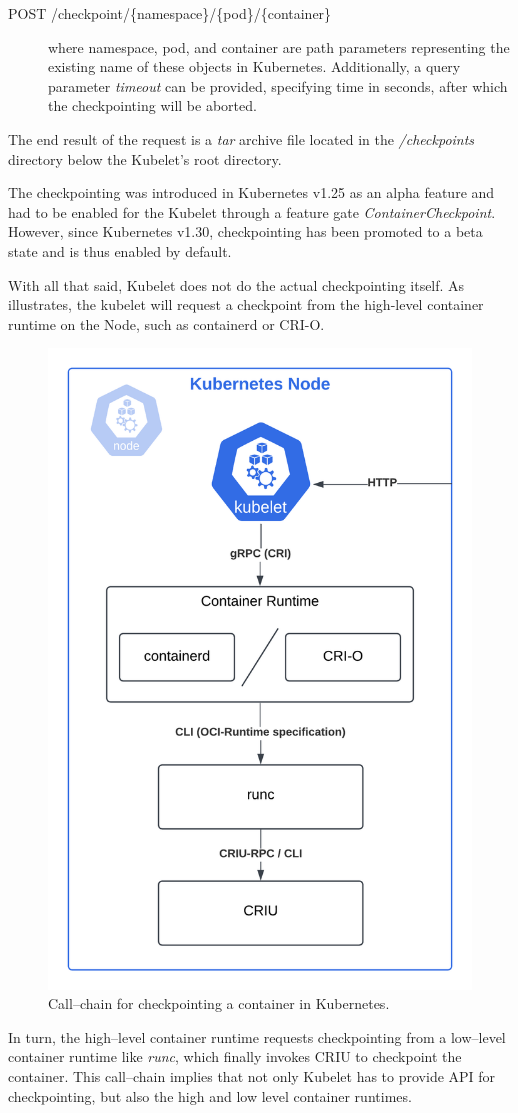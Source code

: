 \documentclass[
  digital,     %
  oneside,     %
  nosansbold,  %
  nocolorbold, %
  lof,         %
  lot,         %
]{fithesis4}
\begin{document}
\begin{description}
    \item[POST /checkpoint/\{namespace\}/\{pod\}/\{container\}] where namespace, pod, and container are path parameters representing the existing name of these objects in Kubernetes. Additionally, a query parameter \emph{timeout} can be provided, specifying time in seconds, after which the checkpointing will be aborted.
\end{description}
The end result of the request is a \emph{tar} archive file located in the \emph{/checkpoints} directory below the Kubelet's root directory.

The checkpointing was introduced in Kubernetes v1.25 as an alpha feature and had to be enabled for the Kubelet through a feature gate \emph{ContainerCheckpoint}. However, since Kubernetes v1.30, checkpointing has been promoted to a beta state and is thus enabled by default.

With all that said, Kubelet does not do the actual checkpointing itself. As  illustrates, the kubelet will request a checkpoint from the high-level container runtime on the Node, such as containerd or CRI-O.
\begin{figure}[H]
  \begin{center}
  \includegraphics[width=.6\textwidth]{figures/checkpoint-callchain.png}
  \end{center}
  \caption{Call--chain for checkpointing a container in Kubernetes.}
  \label{fig:criu-calltrace}
\end{figure}
In turn, the high--level container runtime requests checkpointing from a low--level container runtime like \emph{runc}, which finally invokes CRIU to checkpoint the container. This call--chain implies that not only Kubelet has to provide API for checkpointing, but also the high and low level container runtimes.
\end{document}

